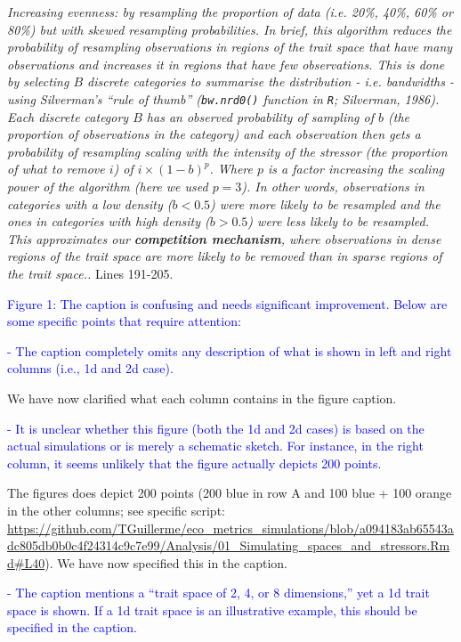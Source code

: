 \documentclass[
]{article}
\begin{document}
\textit{Increasing evenness: by resampling the proportion of data (i.e. 20\%, 40\%, 60\% or 80\%) but with skewed resampling probabilities.
In brief, this algorithm reduces the probability of resampling observations in regions of the trait space that have many observations and increases it in regions that have few observations.
This is done by selecting $B$ discrete categories to summarise the distribution - i.e. bandwidths - using Silverman's ``rule of thumb'' (\texttt{bw.nrd0()} function in \texttt{R}; Silverman, 1986).
Each discrete category $B$ has an observed probability of sampling of $b$ (the proportion of observations in the category) and each observation then gets a probability of resampling scaling with the intensity of the stressor (the proportion of what to remove $i$) of $i \times (1-b)^{p}$. 
Where $p$ is a factor increasing the scaling power of the algorithm (here we used $p=3$).
In other words, observations in categories with a low density ($b<0.5$) were more likely to be resampled and the ones in categories with high density ($b>0.5$) were less likely to be resampled.
This approximates our \textbf{competition mechanism}, where observations in dense regions of the trait space are more likely to be removed than in sparse regions of the trait space..}
Lines 191-205.

\textcolor{blue}{Figure 1: The caption is confusing and needs significant improvement.
Below are some specific points that require attention:}

\textcolor{blue}{- The caption completely omits any description of what is shown in left and right columns (i.e., 1d and 2d case).}

We have now clarified what each column contains in the figure caption.

\textcolor{blue}{- It is unclear whether this figure (both the 1d and 2d cases) is based on the actual simulations or is merely a schematic sketch.
For instance, in the right column, it seems unlikely that the figure actually depicts 200 points.}

The figures does depict 200 points (200 blue in row A and 100 blue + 100 orange in the other columns; see specific script: \url{https://github.com/TGuillerme/eco_metrics_simulations/blob/a094183ab65543adc805db0b0c4f24314c9c7e99/Analysis/01_Simulating_spaces_and_stressors.Rmd#L40}).
We have now specified this in the caption.

\textcolor{blue}{- The caption mentions a ``trait space of 2, 4, or 8 dimensions,'' yet a 1d trait space is shown.
If a 1d trait space is an illustrative example, this should be specified in the caption.}
\end{document}
